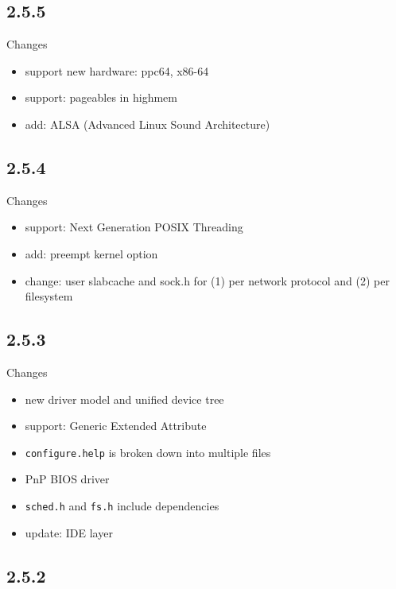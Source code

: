 \subsection{2.5.5}


Changes
\begin{itemize}
  \item support new hardware: ppc64, x86-64
  \item support: pageables in highmem
  
  \item add: ALSA (Advanced Linux Sound Architecture)
\end{itemize}

\subsection{2.5.4}

Changes
\begin{itemize}
  \item support: Next Generation POSIX Threading
  \item add: preempt kernel option
  \item change: user slabcache and sock.h for (1) per network protocol 
  and (2) per filesystem 
\end{itemize}

\subsection{2.5.3}

Changes
\begin{itemize}
  \item new driver model and unified device tree
  \item support: Generic Extended Attribute
  \item \verb!configure.help! is broken down into multiple files
  \item PnP BIOS driver
  \item \verb!sched.h! and \verb!fs.h! include dependencies
  \item update: IDE layer
\end{itemize}


\subsection{2.5.2}

